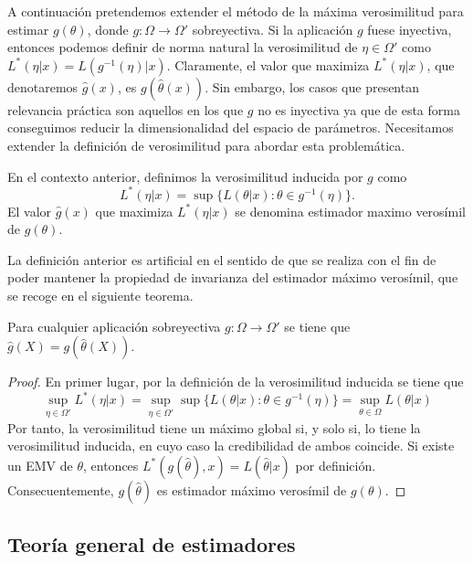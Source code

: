\documentclass{article}
\begin{document}
    A continuación pretendemos extender el método de la máxima verosimilitud para estimar $g(\theta)$, donde $g : \Omega \to \Omega'$ sobreyectiva. Si la aplicación $g$ fuese inyectiva, entonces podemos definir de norma natural la verosimilitud de $\eta \in \Omega'$ como $L^*(\eta | x) = L(g^{-1}(\eta) | x)$. Claramente, el valor que maximiza $L^*(\eta | x)$, que denotaremos $\hat{g}(x)$, es $g(\hat{\theta}(x))$. Sin embargo, los casos que presentan relevancia práctica son aquellos en los que $g$ no es inyectiva ya que de esta forma conseguimos reducir la dimensionalidad del espacio de parámetros. Necesitamos extender la definición de verosimilitud para abordar esta problemática.

    \begin{definition}
        En el contexto anterior, definimos la verosimilitud inducida por $g$ como
        \[L^*(\eta|x) = \sup\{L(\theta | x): \theta \in g^{-1}(\eta)\}.\]
        El valor $\hat{g}(x)$ que maximiza $L^*(\eta|x)$ se denomina estimador maximo verosímil de $g(\theta)$.
    \end{definition}

    La definición anterior es artificial en el sentido de que se realiza con el fin de poder mantener la propiedad de invarianza del estimador máximo verosímil, que se recoge en el siguiente teorema.

    \begin{thm}
        Para cualquier aplicación sobreyectiva $g: \Omega \to \Omega'$ se tiene que $\hat{g}(X) = g(\hat{\theta}(X))$.
    \end{thm}
    \begin{proof}
        En primer lugar, por la definición de la verosimilitud inducida se tiene que
        \[\sup_{\eta \in \Omega'} L^*(\eta|x) = \sup_{\eta \in \Omega'} \sup\{L(\theta | x): \theta \in g^{-1}(\eta)\} = \sup_{\theta \in \Omega} L(\theta | x)\]
        Por tanto, la verosimilitud tiene un máximo global si, y solo si, lo tiene la verosimilitud inducida, en cuyo caso la credibilidad de ambos coincide. Si existe un EMV de $\theta$, entonces $L^*(g(\hat{\theta}),x) = L(\hat{\theta} | x)$ por definición. Consecuentemente, $g(\hat{\theta})$ es estimador máximo verosímil de $g(\theta)$.
    \end{proof}

    \subsection{Teoría general de estimadores}
\end{document}
